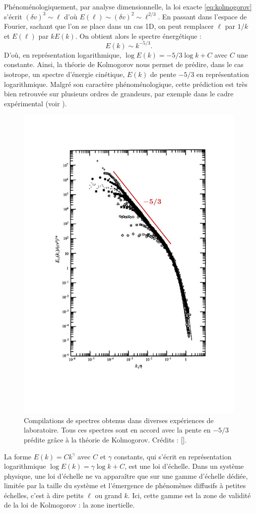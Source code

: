 Phénoménologiquement, par analyse dimensionnelle, la loi exacte \eqref{eq:kolmogorov} s'écrit $(\delta v)^3 \sim \ell$ d'où $E(\ell) \sim (\delta v)^2 \sim \ell^{2/3}$. En passant dans l'espace de Fourier, sachant que l'on se place dans un cas 1D, on peut remplacer $\ell$ par $1/k$ et $E(\ell)$ par $k E(k)$. On obtient alors le spectre énergétique :
\begin{equation}
    E(k) \sim k^{-5/3}.
\end{equation} 
D'où, en représentation logarithmique, $\log E(k) = -5/3 \log k + C $ avec $C$ une constante. Ainsi, la théorie de Kolmogorov nous permet de prédire, dans le cas isotrope, un spectre d'énergie cinétique, $E(k)$ de pente $-5/3$ en représentation logarithmique. Malgré son caractère phénoménologique, cette prédiction est très bien retrouvée sur plusieurs ordres de grandeurs, par exemple dans le cadre expérimental (voir  ). 
\begin{figure}[!ht]
 \centering
\includegraphics[width=0.8\linewidth,trim=1cm 4cm 1cm 3cm, clip=true]{./Part_0/images/spectre_kolmogorov}
\cprotect\caption{Compilations de spectres obtenus dans diverses expériences de laboratoire. Tous ces spectres sont en accord avec la pente en $-5/3$ prédite grâce à la théorie de Kolmogorov. Crédits : [\cite{saddoughi_local_1994}]. }
\label{fig:spec_kolmo}
\end{figure}
La forme $E(k) = C k^{\gamma}$ avec $C$ et $\gamma$ constants, qui s'écrit  en représentation logarithmique $\log E(k) = \gamma \log k + C $, est une loi d'échelle. Dans un système physique, une loi d'échelle ne va apparaître que sur une gamme d'échelle dédiée, limitée par la taille du système et l'émergence de phénomènes diffusifs à petites échelles, c'est à dire petits $\ell$ ou grand $k$. Ici, cette gamme est la zone de validité de la loi de Kolmogorov : la zone inertielle. 

